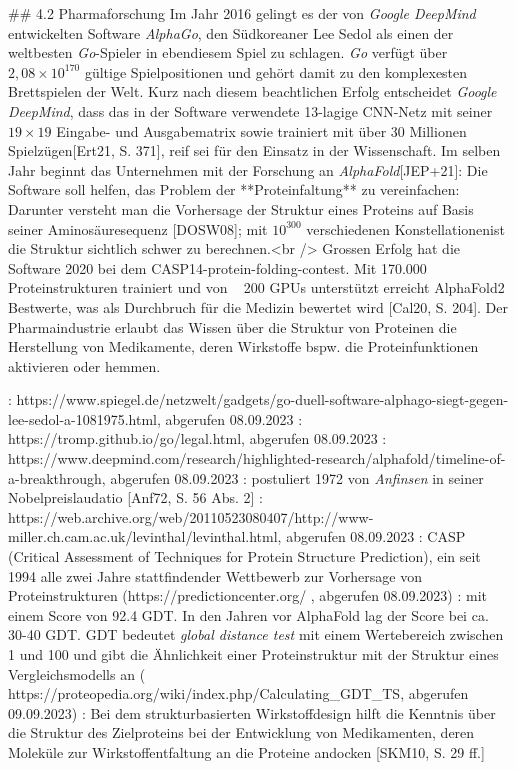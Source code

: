 ## 4.2 Pharmaforschung
Im Jahr 2016 gelingt es der von \textit{Google DeepMind} entwickelten Software \textit{AlphaGo}, den Südkoreaner Lee Sedol als einen der weltbesten \textit{Go}-Spieler in ebendiesem Spiel zu schlagen\footnotemark[6]. \textit{Go} verfügt über $2,08 \times 10^{170}$ gültige Spielpositionen und gehört damit zu den komplexesten Brettspielen der Welt\footnotemark[7]. Kurz nach diesem beachtlichen Erfolg entscheidet \textit{Google DeepMind}, dass das in der Software verwendete 13-lagige CNN-Netz mit seiner $19 \times 19$ Eingabe- und Ausgabematrix sowie trainiert mit über 30 Millionen Spielzügen[Ert21, S. 371], reif sei für den Einsatz in der Wissenschaft. Im selben Jahr beginnt das Unternehmen mit der Forschung an \textit{AlphaFold}[JEP+21]\footnotemark[8]: Die Software soll helfen, das Problem der **Proteinfaltung** zu vereinfachen: Darunter versteht man die Vorhersage der Struktur eines Proteins auf Basis seiner Aminosäuresequenz  [DOSW08]\footnotemark[9]; mit $10^{300}$ verschiedenen Konstellationen\footnotemark[10] ist die Struktur sichtlich schwer zu berechnen.<br />
Grossen Erfolg hat die Software 2020 bei dem CASP14-protein-folding-contest\footnotemark[11]. Mit 170.000 Proteinstrukturen trainiert und von ~ 200 GPUs unterstützt erreicht AlphaFold2 Bestwerte\footnotemark[12], was als Durchbruch für die Medizin bewertet wird [Cal20, S. 204]. Der Pharmaindustrie erlaubt das Wissen über die Struktur von Proteinen die Herstellung von Medikamente, deren Wirkstoffe bspw. die Proteinfunktionen aktivieren oder hemmen\footnotemark[13].

\footnotemark[6]: https://www.spiegel.de/netzwelt/gadgets/go-duell-software-alphago-siegt-gegen-lee-sedol-a-1081975.html, abgerufen 08.09.2023
\footnotemark[7]: https://tromp.github.io/go/legal.html, abgerufen 08.09.2023
\footnotemark[8]: https://www.deepmind.com/research/highlighted-research/alphafold/timeline-of-a-breakthrough, abgerufen 08.09.2023
\footnotemark[9]: postuliert 1972 von \textit{Anfinsen} in seiner Nobelpreislaudatio  [Anf72, S. 56 Abs. 2]
\footnotemark[10]: https://web.archive.org/web/20110523080407/http://www-miller.ch.cam.ac.uk/levinthal/levinthal.html, abgerufen 08.09.2023
\footnotemark[11]: CASP (Critical Assessment of Techniques for Protein Structure Prediction), ein seit 1994 alle zwei Jahre stattfindender Wettbewerb zur Vorhersage von Proteinstrukturen (https://predictioncenter.org/ , abgerufen 08.09.2023)
\footnotemark[12]: mit einem Score von 92.4 GDT. In den Jahren vor AlphaFold lag der Score bei ca. ~ 30-40 GDT. GDT bedeutet \textit{global distance test} mit einem Wertebereich zwischen 1 und 100 und gibt die Ähnlichkeit einer Proteinstruktur mit der Struktur eines Vergleichsmodells an (
https://proteopedia.org/wiki/index.php/Calculating_GDT_TS, abgerufen 09.09.2023)
\footnotemark[13]: Bei dem strukturbasierten Wirkstoffdesign hilft die Kenntnis über die Struktur des Zielproteins bei der Entwicklung von Medikamenten, deren Moleküle zur Wirkstoffentfaltung an die Proteine andocken [SKM10, S. 29 ff.]



